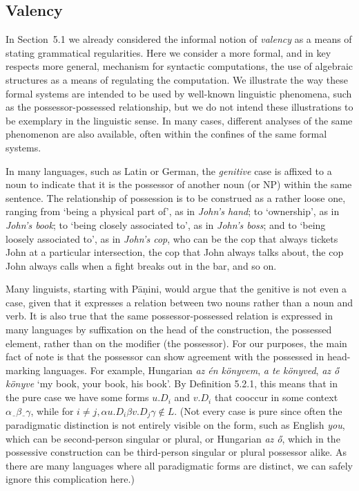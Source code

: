 \subsection{Valency}

In Section~5.1 we already considered the informal notion of {\it valency} as a
means of stating grammatical regularities. Here we consider a more formal, and
in key respects more general, mechanism for syntactic computations, the use of
algebraic structures as a means of regulating the computation. We illustrate
the way these formal systems are intended to be used by well-known linguistic
phenomena, such as the possessor-possessed relationship, but we do not intend
these illustrations to be exemplary in the linguistic sense. In many cases,
different analyses of the same phenomenon are also available, often within the
confines of the same formal systems.

In many languages, such as Latin or German, the {\it genitive}
case is affixed to a noun to indicate that it is the possessor of another noun
(or NP) within the same sentence. The relationship of possession is to be
construed as a rather loose one, ranging from `being a physical part of', as
in {\it John's hand}; to `ownership', as in {\it John's book}; to `being
closely associated to', as in {\it John's boss}; and to `being loosely
associated to', as in {\it John's cop}, who can be the cop that always tickets
John at a particular intersection, the cop that John always talks about, the
cop John always calls when a fight breaks out in the bar, and so on.

Many linguists, starting with P\={a}\d{n}ini, would
argue that the genitive is not even a case, given that it expresses a relation
between two nouns rather than a noun and verb. It is also true that the same
possessor-possessed relation is expressed in many languages by suffixation on
the head of the construction, the possessed element, rather than on the
modifier (the possessor). For our purposes, the main fact of note is that the
possessor can show agreement with the possessed in head-marking languages. For
example, Hungarian {\it az \'{e}n k\"{o}nyvem}, {\it a te k\"{o}nyved}, {\it
  az \H{o} k\"{o}nyve} `my book, your book, his book'. By Definition 5.2.1,
this means that in the pure case we have some forms $u.D_i$ and $v.D_i$ that
cooccur in some context $\alpha\underline{\ \ }\beta\underline{\ \ }\gamma$,
while for $i\neq j, \alpha u.D_i \beta v.D_j \gamma \not\in L$.  (Not every
case is pure since often the paradigmatic distinction is not entirely visible
on the form, such as English {\it you}, which can be second-person singular or
plural, or Hungarian {\it az \H{o}}, which in the possessive construction can
be third-person singular or plural possessor alike.  As there are many
languages where all paradigmatic forms are distinct, we can safely ignore this
complication here.)

